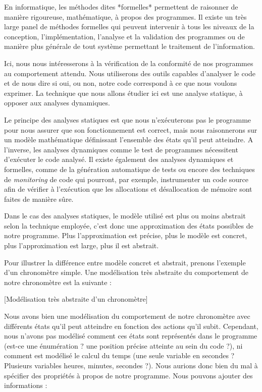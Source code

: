
En informatique, les méthodes dites *formelles* permettent
 de raisonner de manière rigoureuse, mathématique, à propos des
programmes. Il existe un très large panel de méthodes formelles qui peuvent
intervenir à tous les niveaux de la conception, l'implémentation, l'analyse et
la validation des programmes ou de manière plus générale de tout système
permettant le traitement de l'information.



Ici, nous nous intéresserons à la vérification de la conformité de nos
programmes au comportement attendu. Nous utiliserons
des outils capables d'analyser le code et de nous dire si oui, ou non, notre
code correspond à ce que nous voulons exprimer. La technique que nous allons
étudier ici est une analyse statique, à opposer aux analyses dynamiques.



Le principe des analyses statiques est que nous n'exécuterons pas le programme
pour nous assurer que son fonctionnement est correct, mais nous raisonnerons sur
un modèle mathématique définissant l'ensemble des états qu'il peut atteindre.
A l'inverse, les analyses dynamiques comme le test de programmes nécessitent
d'exécuter le code analysé. Il existe également des analyses dynamiques et
formelles, comme de la génération automatique de tests ou encore des techniques
de \textit{monitoring} de code qui pourront, par exemple, instrumenter un code
source afin de vérifier à l'exécution que les allocations et désallocation de
mémoire sont faites de manière sûre.



Dans le cas des analyses statiques, le modèle utilisé est plus ou moins
abstrait selon la technique employée, c'est donc une approximation des états
possibles de notre programme. Plus l'approximation est précise, plus le modèle est
concret, plus l'approximation est large, plus il est abstrait.



Pour illustrer la différence entre modèle concret et abstrait, prenons
l'exemple d'un chronomètre simple. Une modélisation très abstraite du
comportement de notre chronomètre est la suivante :


[Modélisation très abstraite d'un chronomètre]


Nous avons bien une modélisation du comportement de notre chronomètre avec
différents états qu'il peut atteindre en fonction des actions qu'il subit.
Cependant, nous n'avons pas modélisé comment ces états sont
représentés dans le programme (est-ce une énumération ? une position précise
atteinte au sein du code ?), ni comment est modélisé le calcul du temps (une seule
variable en secondes ? Plusieurs variables heures, minutes, secondes ?). Nous
aurions donc bien du mal à spécifier des propriétés à propos de notre programme.
Nous pouvons ajouter des informations :



